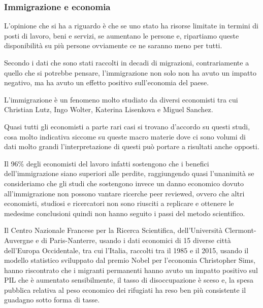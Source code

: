 \documentclass[12pt]{book} %
\begin{document}
\bigskip

\subsubsection{Immigrazione e economia}
L'opinione che si ha a riguardo è che se uno stato ha risorse limitate in termini di posti di
lavoro, beni e servizi, se aumentano le persone e, ripartiamo queste disponibilità su più persone ovviamente ce ne
saranno meno per tutti.

Secondo i dati che sono stati raccolti in decadi di migrazioni, contrariamente a quello che si potrebbe pensare,
l'immigrazione non solo non ha avuto un impatto negativo, ma ha avuto un effetto positivo
sull'economia del paese.

L'immigrazione è un fenomeno molto studiato da diversi economisti tra cui Christian Lutz, Ingo
Wolter, Katerina Lisenkova e Miguel Sanchez.

Quasi tutti gli economisti a parte rari casi si trovano d'accordo su questi studi, cosa molto
indicativa siccome su queste macro materie dove ci sono volumi di dati molto grandi
l'interpretazione di questi può portare a risultati anche opposti.

Il 96\% degli economisti del lavoro infatti sostengono che i benefici dell'immigrazione siano
superiori alle perdite, raggiungendo quasi
l'unanimità se consideriamo che gli studi che sostengono invece un danno economico dovuto
all'immigrazione non possono vantare ricerche peer reviewed, ovvero che altri economisti, studiosi e ricercatori non sono riusciti a
replicare e ottenere le medesime conclusioni quindi non hanno seguito i passi del metodo scientifico.


\bigskip

Il Centro Nazionale Francese per la Ricerca Scientifica, dell'Università Clermont-Auvergne e di Paris-Nanterre, usando i
dati economici di 15 diverse città dell'Europa Occidentale, tra cui l'Italia, raccolti tra il 1985
e il 2015, usando il modello statistico sviluppato dal
premio Nobel per l'economia Christopher Sims, hanno riscontrato che i migranti permanenti hanno avuto un impatto
positivo sul PIL che è aumentato {\textquotedbl}sensibilmente{\textquotedbl}, il tasso di disoccupazione è sceso e, la
spesa pubblica relativa al peso economico dei rifugiati ha reso ben più consistente il guadagno sotto forma di
tasse.
\end{document}
